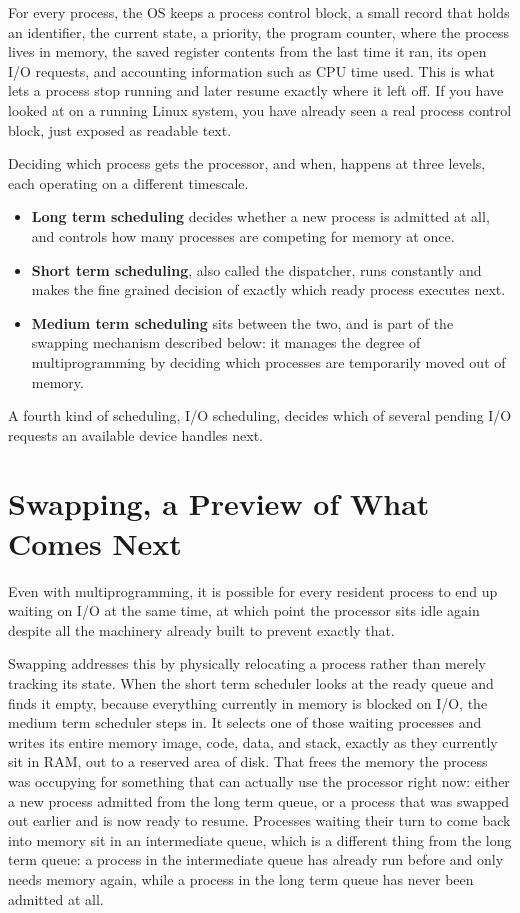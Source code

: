 \documentclass[11pt]{article}
\begin{document}
For every process, the OS keeps a process control block, a small record that holds an identifier, the current state, a priority, the program counter, where the process lives in memory, the saved register contents from the last time it ran, its open I/O requests, and accounting information such as CPU time used. This is what lets a process stop running and later resume exactly where it left off. If you have looked at  on a running Linux system, you have already seen a real process control block, just exposed as readable text.

Deciding which process gets the processor, and when, happens at three levels, each operating on a different timescale.

\begin{itemize}[leftmargin=1.4em]
  \item \textbf{Long term scheduling} decides whether a new process is admitted at all, and controls how many processes are competing for memory at once.
  \item \textbf{Short term scheduling}, also called the dispatcher, runs constantly and makes the fine grained decision of exactly which ready process executes next.
  \item \textbf{Medium term scheduling} sits between the two, and is part of the swapping mechanism described below: it manages the degree of multiprogramming by deciding which processes are temporarily moved out of memory.
\end{itemize}

A fourth kind of scheduling, I/O scheduling, decides which of several pending I/O requests an available device handles next.

\section{Swapping, a Preview of What Comes Next}

Even with multiprogramming, it is possible for every resident process to end up waiting on I/O at the same time, at which point the processor sits idle again despite all the machinery already built to prevent exactly that.

Swapping addresses this by physically relocating a process rather than merely tracking its state. When the short term scheduler looks at the ready queue and finds it empty, because everything currently in memory is blocked on I/O, the medium term scheduler steps in. It selects one of those waiting processes and writes its entire memory image, code, data, and stack, exactly as they currently sit in RAM, out to a reserved area of disk. That frees the memory the process was occupying for something that can actually use the processor right now: either a new process admitted from the long term queue, or a process that was swapped out earlier and is now ready to resume. Processes waiting their turn to come back into memory sit in an intermediate queue, which is a different thing from the long term queue: a process in the intermediate queue has already run before and only needs memory again, while a process in the long term queue has never been admitted at all.
\end{document}
